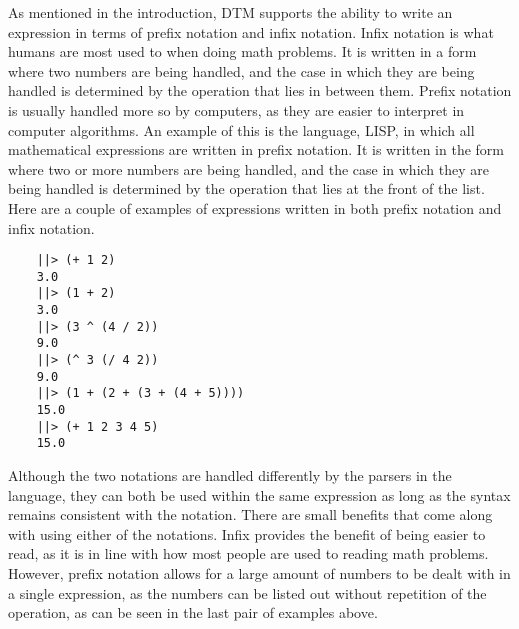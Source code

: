 \documentclass[10pt]{article}
\begin{document}
As mentioned in the introduction, DTM supports the ability to write an expression in terms of prefix notation and infix notation. Infix notation is what humans are most used to when doing math problems. It is written in a form where two numbers are being handled, and the case in which they are being handled is determined by the operation that lies in between them. Prefix notation is usually handled more so by computers, as they are easier to interpret in computer algorithms. An example of this is the language, LISP, in which all mathematical expressions are written in prefix notation. It is written in the form where two or more numbers are being handled, and the case in which they are being handled is determined by the operation that lies at the front of the list. Here are a couple of examples of expressions written in both prefix notation and infix notation.

\begin{verbatim}
    ||> (+ 1 2)
    3.0
    ||> (1 + 2)
    3.0
    ||> (3 ^ (4 / 2))
    9.0
    ||> (^ 3 (/ 4 2))
    9.0
    ||> (1 + (2 + (3 + (4 + 5))))
    15.0
    ||> (+ 1 2 3 4 5)
    15.0
\end{verbatim}

Although the two notations are handled differently by the parsers in the language, they can both be used within the same expression as long as the syntax remains consistent with the notation. There are small benefits that come along with using either of the notations. Infix provides the benefit of being easier to read, as it is in line with how most people are used to reading math problems. However, prefix notation allows for a large amount of numbers to be dealt with in a single expression, as the numbers can be listed out without repetition of the operation, as can be seen in the last pair of examples above.
\end{document}

